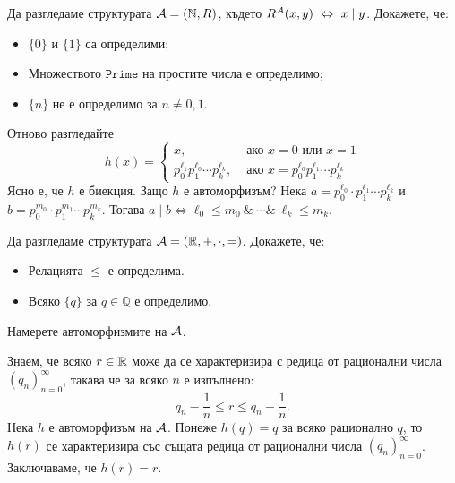 \begin{problem}
  Да разгледаме структурата $\mathcal{A} = (\mathbb{N}, R)$, където $R^{\mathcal{A}}(x,y) \ \Leftrightarrow\  x \mid y$.
  Докажете, че:
  \begin{itemize}
  \item
    $\{0\}$ и $\{1\}$ са определими;
  \item
    Множеството $\texttt{Prime}$ на простите числа е определимо;
  \item
    $\{n\}$ не е определимо за $n \neq 0,1$.
  \end{itemize}
\end{problem}
\begin{hint}
  Отново разгледайте
  \[h(x) =
    \begin{cases}
      x, & \text{ ако }x = 0 \text{ или } x = 1\\
      p^{\ell_1}_0p^{\ell_0}_1\cdots p^{\ell_k}_k, & \text{ ако }x = p^{\ell_0}_0 p^{\ell_1}_1 \cdots p^{\ell_k}_k
    \end{cases}\]
  Ясно е, че $h$ е биекция. Защо $h$ е автоморфизъм?
  Нека $a = p^{\ell_0}_0 \cdot p^{\ell_1}_1 \cdots p^{\ell_k}_k$ и $b = p^{m_0}_0 \cdot p^{m_1}_1 \cdots p^{m_k}_k$. Тогава
  $a \mid b \iff \ell_0 \leq m_0\ \&\ \cdots \&\ \ell_k \leq m_k$.
\end{hint}

\begin{problem}
  Да разгледаме структурата $\mathcal{A} = (\mathbb{R}, +, \cdot, =)$.
  Докажете, че:
  \begin{itemize}
  \item
    Релацията $\leq$ е определима.
  \item
    Всяко $\{q\}$ за $q \in \mathbb{Q}$ е определимо.
  \end{itemize}
  Намерете автоморфизмите на $\mathcal{A}$.
\end{problem}
\begin{hint}
  Знаем, че всяко $r \in \mathbb{R}$ може да се характеризира с редица от рационални числа $(q_n)^\infty_{n=0}$, такава че
  за всяко $n$ е изпълнено:
  \[ q_n - \frac{1}{n} \leq r \leq q_n + \frac{1}{n}.\]
  Нека $h$ е автоморфизъм на $\mathcal{A}$. Понеже $h(q) = q$ за всяко рационално $q$, то
  $h(r)$ се характеризира със същата редица от рационални числа $(q_n)^{\infty}_{n=0}$.
  Заключаваме, че $h(r) = r$.
\end{hint}


